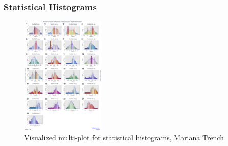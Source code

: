 \documentclass[pdflatex,compress,10pt,
	xcolor={dvipsnames,dvipsnames,svgnames,x11names,table},
	hyperref={colorlinks = true,breaklinks = true, urlcolor = NavyBlue, breaklinks = true}]{beamer}
\begin{document}
\begin{frame}\frametitle{Statistical Histograms}
\begin{figure}[H]
	\centering
		\includegraphics[width=4cm]{Fig-2-9.jpg}\caption{Visualized multi-plot for statistical histograms, Mariana Trench}
\end{figure}		
\end{frame}
\end{document}
